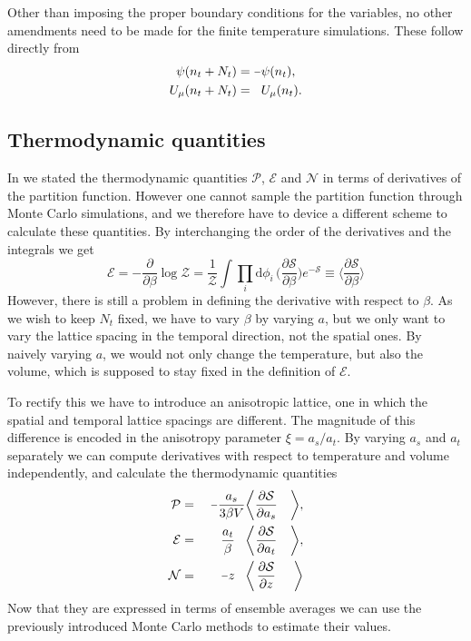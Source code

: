 Other than imposing the proper boundary conditions for the variables, no other
amendments need to be made for the finite temperature simulations. These follow
directly from 
%
\begin{align}
  \psi(n_t + N_t) &= \minus \psi(n_t), \\
  U_{\mu}(n_t + N_t) &= \hphantom{\minus} U_{\mu}(n_t).
\end{align}

\subsection{Thermodynamic quantities}

In  we stated the thermodynamic quantities $\mathcal{P}$,
$\mathcal{E}$ and $\mathcal{N}$ in terms of derivatives of the partition
function. However one cannot sample the partition function through Monte Carlo
simulations, and we therefore have to device a different scheme to calculate
these quantities. By interchanging the order of the derivatives and the
integrals we get 
%
\begin{equation}
  \mathcal{E} = \minus\frac{\partial}{\partial \beta} \log \mathcal{Z}
    = \frac{1}{\mathcal{Z}} \int \prod_i \mathrm{d} \phi_i \, 
    \bigg( \frac{\partial\mathcal{S}}{\partial \beta} \bigg) e^{-\mathcal{S}}
    \equiv \bigg\langle \frac{\partial\mathcal{S}}{\partial \beta} \bigg\rangle
\end{equation}
%
However, there is still a problem in defining the derivative with respect to
$\beta$. As we wish to keep $N_t$ fixed, we have to vary $\beta$ by varying $a$,
but we only want to vary the lattice spacing in the temporal direction, not the
spatial ones. By naively varying $a$, we would not only change the temperature,
but also the volume, which is supposed to stay fixed in the definition of
$\mathcal{E}$.

To rectify this we have to introduce an anisotropic lattice, one in which the
spatial and temporal lattice spacings are different. The magnitude of this
difference is encoded in the anisotropy parameter $\xi = a_s / a_t$. By varying
$a_s$ and $a_t$ separately we can compute derivatives with respect to
temperature and volume independently, and calculate the thermodynamic quantities
%
\begin{alignat}{99}
  \mathcal{P} &{}={}& \centermathcell{\minus\frac{a_s}{3 \beta V}} \bigg\langle &
    \centermathcell{\frac{\partial \mathcal{S}}{\partial a_s}} &\bigg\rangle, \\
  \mathcal{E} &{}={}& \centermathcell{\frac{a_t}{\beta}} \bigg\langle &
    \centermathcell{\frac{\partial \mathcal{S}}{\partial a_t}} &\bigg\rangle, \\
  \mathcal{N} &{}={}& \centermathcell{\minus{}z} \bigg\langle & 
    \centermathcell{\frac{\partial \mathcal{S}}{\partial z}} &\bigg\rangle
\end{alignat}
%
Now that they are expressed in terms of ensemble averages we can use the
previously introduced Monte Carlo methods to estimate their values.

